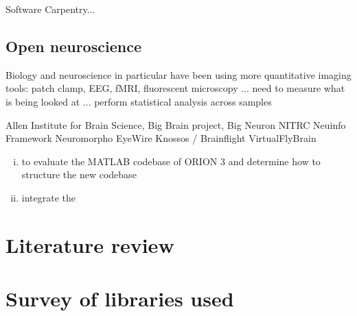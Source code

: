 

Software Carpentry...


\subsection{Open neuroscience}
Biology and neuroscience in particular have been using more
quantitative imaging tools: patch clamp, EEG, fMRI, fluorescent
microscopy ... need to measure what is being looked at ... perform
statistical analysis across samples

Allen Institute for Brain Science,
Big Brain project,
Big Neuron
NITRC
Neuinfo  Framework
Neuromorpho
EyeWire
Knossos / Brainflight
VirtualFlyBrain
\citep{FrontNeuroinform:NeuroDebian}

\begin{enumerate}[(i)]
\item to evaluate the MATLAB codebase of ORION 3 and determine how to structure the new codebase
\item integrate the
\end{enumerate}

\section{Literature review}

%

\section{Survey of libraries used}


